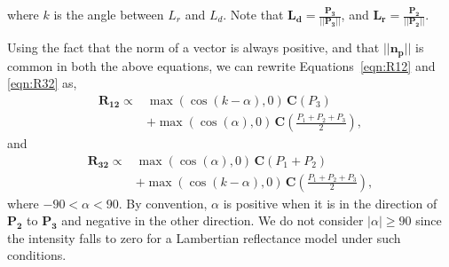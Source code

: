 where $k$ is the angle between $L_r$ and $L_d$.
Note that $\mathbf{L_d} = \frac{\mathbf{P_3}}{||\mathbf{P_3}||}$, and
$\mathbf{L_r} = \frac{\mathbf{P_2}}{||\mathbf{P_2}||}$.

Using the fact that the norm of a vector is always positive, and that $||\mathbf{n_p}||$ is common in both the above equations,
we can rewrite Equations~\ref{eqn:R12} and \ref{eqn:R32} as,
%
\begin{align}
\mathbf{R_{12}} \propto & \max{(\cos(k - \alpha), 0)} \, \mathbf{C}(P_3) \nonumber\\
					 & + \max{(\cos(\alpha), 0)} \, \mathbf{C}\left(\frac{P_1 + P_2 + P_3}{2}\right),
\end{align}
%
and
\begin{align}
\mathbf{R_{32}} \propto & \max{(\cos(\alpha), 0)} \, \mathbf{C}(P_1 + P_2)\nonumber\\
					& + \max{(\cos(k - \alpha), 0)} \, \mathbf{C}\left(\frac{P_1 + P_2 + P_3}{2}\right),
\end{align}
where $-90 < \alpha < 90$.
By convention, $\alpha$ is positive when it is in the direction of $\mathbf{P_2}$ to $\mathbf{P_3}$ and negative in the other direction.
We do not consider $|\alpha| \ge 90$ since the intensity falls to zero for a Lambertian reflectance model under such conditions.
